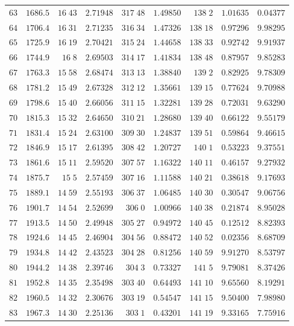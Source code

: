 \begin{center}
\begin{tabular}{r|r|r|r|r|r|r|r|r}
$63$&$1686.5$&$16\;43$&$2.71948$&$317\;48$&$1.49850$&$138\;2$&$1.01635$&$0.04377$\\
$64$&$1706.4$&$16\;31$&$2.71235$&$316\;34$&$1.47326$&$138\;18$&$0.97296$&$9.98295$\\[2pt]
$65$&$1725.9$&$16\;19$&$2.70421$&$315\;24$&$1.44658$&$138\;33$&$0.92742$&$9.91937$\\
$66$&$1744.9$&$16\;8$&$2.69503$&$314\;17$&$1.41834$&$138\;48$&$0.87957$&$9.85283$\\
$67$&$1763.3$&$15\;58$&$2.68474$&$313\;13$&$1.38840$&$139\;2$&$0.82925$&$9.78309$\\
$68$&$1781.2$&$15\;49$&$2.67328$&$312\;12$&$1.35661$&$139\;15$&$0.77624$&$9.70988$\\
$69$&$1798.6$&$15\;40$&$2.66056$&$311\;15$&$1.32281$&$139\;28$&$0.72031$&$9.63290$\\[2pt]
$70$&$1815.3$&$15\;32$&$2.64650$&$310\;21$&$1.28680$&$139\;40$&$0.66122$&$9.55179$\\
$71$&$1831.4$&$15\;24$&$2.63100$&$309\;30$&$1.24837$&$139\;51$&$0.59864$&$9.46615$\\
$72$&$1846.9$&$15\;17$&$2.61395$&$308\;42$&$1.20727$&$140\;1$&$0.53223$&$9.37551$\\
$73$&$1861.6$&$15\;11$&$2.59520$&$307\;57$&$1.16322$&$140\;11$&$0.46157$&$9.27932$\\
$74$&$1875.7$&$15\;5$&$2.57459$&$307\;16$&$1.11588$&$140\;21$&$0.38618$&$9.17693$\\[2pt]
$75$&$1889.1$&$14\;59$&$2.55193$&$306\;37$&$1.06485$&$140\;30$&$0.30547$&$9.06756$\\
$76$&$1901.7$&$14\;54$&$2.52699$&$306\;0$&$1.00966$&$140\;38$&$0.21874$&$8.95028$\\
$77$&$1913.5$&$14\;50$&$2.49948$&$305\;27$&$0.94972$&$140\;45$&$0.12512$&$8.82393$\\
$78$&$1924.6$&$14\;45$&$2.46904$&$304\;56$&$0.88472$&$140\;52$&$0.02356$&$8.68709$\\
$79$&$1934.8$&$14\;42$&$2.43523$&$304\;28$&$0.81256$&$140\;59$&$9.91270$&$8.53797$\\[2pt]
$80$&$1944.2$&$14\;38$&$2.39746$&$304\;3$&$0.73327$&$141\;5$&$9.79081$&$8.37426$\\
$81$&$1952.8$&$14\;35$&$2.35498$&$303\;40$&$0.64493$&$141\;10$&$9.65560$&$8.19291$\\
$82$&$1960.5$&$14\;32$&$2.30676$&$303\;19$&$0.54547$&$141\;15$&$9.50400$&$7.98980$\\
$83$&$1967.3$&$14\;30$&$2.25136$&$303\;1$&$0.43201$&$141\;19$&$9.33165$&$7.75916$\\

\end{tabular}
\end{center}
